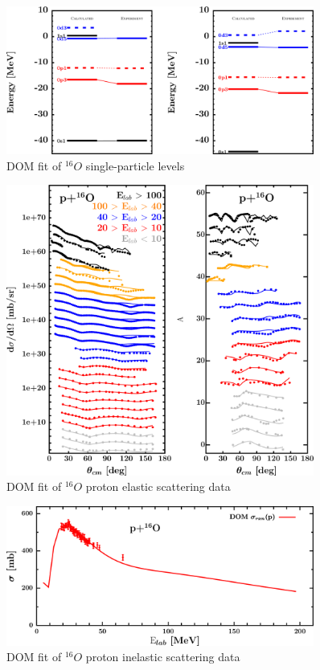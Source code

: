\begin{figure}
\begin{center}
\includegraphics[width = 0.9\textwidth]{figures/o16_SPLevels.png}
\caption{DOM fit of $^{16}O$ single-particle levels}
\label{o16SPLevels}
\end{center}
\end{figure}

\begin{figure}
\begin{center}
\includegraphics[width = 0.9\textwidth]{figures/o16_protonElastic.png}
\caption{DOM fit of $^{16}O$ proton elastic scattering data}
\label{o16ProtonElastic}
\end{center}
\end{figure}

\begin{figure}
\begin{center}
\includegraphics[width = 0.9\textwidth]{figures/o16_protonInelastic.png}
\caption{DOM fit of $^{16}O$ proton inelastic scattering data}
\label{o16ProtonInelastic}
\end{center}
\end{figure}


